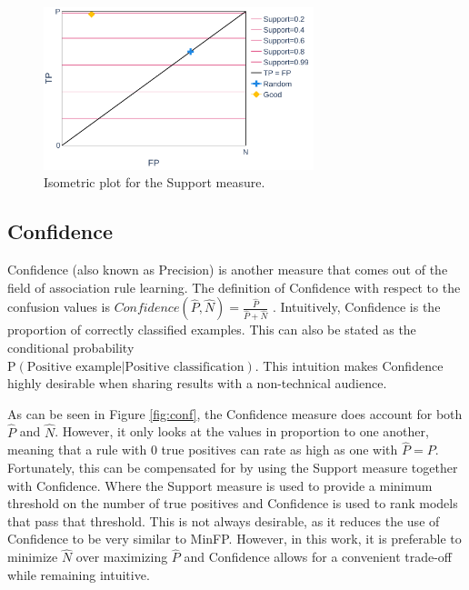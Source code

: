 \begin{figure}[ht]
    \centering
    \includegraphics[width=0.7\textwidth]{Figures/MP-Support}
    \caption{Isometric plot for the Support measure.}
    \label{fig:sup}
\end{figure}

\FloatBarrier
\subsection{Confidence}

Confidence (also known as Precision) is another measure that comes out of the field of association rule learning. The definition of Confidence with respect to the confusion values is
$Confidence(\hat P, \hat N) = \frac{\hat P}{\hat P+\hat N}$
. Intuitively, Confidence is the proportion of correctly classified examples. This can also be stated as the conditional probability
\\$\text{P}(\text{Positive example}| \text{Positive classification})$. This intuition makes Confidence highly desirable when sharing results with a non-technical audience.

As can be seen in Figure \ref{fig:conf}, the Confidence measure does account for both $\hat P$ and $\hat N$. However, it only looks at the values in proportion to one another, meaning that a rule with 0 true positives can rate as high as one with $\hat P = P$. Fortunately, this can be compensated for by using the Support measure together with Confidence. Where the Support measure is used to provide a minimum threshold on the number of true positives and Confidence is used to rank models that pass that threshold. This is not always desirable, as it reduces the use of Confidence to be very similar to MinFP. However, in this work, it is preferable to minimize $\hat N$ over maximizing $\hat P$ and Confidence allows for a convenient trade-off while remaining intuitive. 

